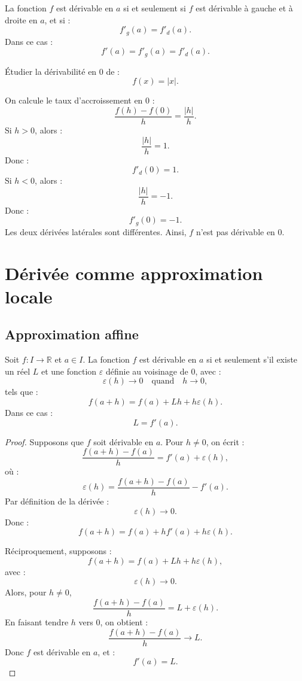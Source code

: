 \documentclass[11pt,a4paper]{article}
\newcommand{\R}{\mathbb R}
\begin{document}
\begin{theorembox}
La fonction \(f\) est dérivable en \(a\) si et seulement si \(f\) est dérivable à gauche et à droite en \(a\), et si :
\[
f'_g(a)=f'_d(a).
\]
Dans ce cas :
\[
f'(a)=f'_g(a)=f'_d(a).
\]
\end{theorembox}

\begin{exercicebox}
Étudier la dérivabilité en \(0\) de :
\[
f(x)=|x|.
\]
\end{exercicebox}

\begin{correctionbox}
On calcule le taux d'accroissement en \(0\) :
\[
\frac{f(h)-f(0)}{h}=\frac{|h|}{h}.
\]
Si \(h>0\), alors :
\[
\frac{|h|}{h}=1.
\]
Donc :
\[
f'_d(0)=1.
\]
Si \(h<0\), alors :
\[
\frac{|h|}{h}=-1.
\]
Donc :
\[
f'_g(0)=-1.
\]
Les deux dérivées latérales sont différentes.  
Ainsi, \(f\) n'est pas dérivable en \(0\).
\end{correctionbox}

\section{Dérivée comme approximation locale}

\subsection{Approximation affine}

\begin{theorembox}
Soit \(f:I\to\R\) et \(a\in I\).  
La fonction \(f\) est dérivable en \(a\) si et seulement s'il existe un réel \(L\) et une fonction \(\varepsilon\) définie au voisinage de \(0\), avec :
\[
\varepsilon(h)\to0
\quad\text{quand}\quad h\to0,
\]
tels que :
\[
f(a+h)=f(a)+Lh+h\varepsilon(h).
\]
Dans ce cas :
\[
L=f'(a).
\]
\end{theorembox}

\begin{proof}
Supposons que \(f\) soit dérivable en \(a\).  
Pour \(h\neq0\), on écrit :
\[
\frac{f(a+h)-f(a)}{h}=f'(a)+\varepsilon(h),
\]
où :
\[
\varepsilon(h)=\frac{f(a+h)-f(a)}{h}-f'(a).
\]
Par définition de la dérivée :
\[
\varepsilon(h)\to0.
\]
Donc :
\[
f(a+h)=f(a)+hf'(a)+h\varepsilon(h).
\]

Réciproquement, supposons :
\[
f(a+h)=f(a)+Lh+h\varepsilon(h),
\]
avec :
\[
\varepsilon(h)\to0.
\]
Alors, pour \(h\neq0\),
\[
\frac{f(a+h)-f(a)}{h}=L+\varepsilon(h).
\]
En faisant tendre \(h\) vers \(0\), on obtient :
\[
\frac{f(a+h)-f(a)}{h}\to L.
\]
Donc \(f\) est dérivable en \(a\), et :
\[
f'(a)=L.
\]
\end{proof}
\end{document}
